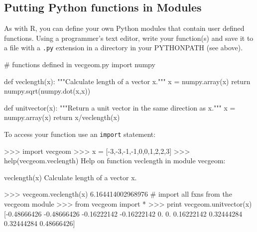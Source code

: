\subsection{Putting Python functions in Modules}

As with R, you can define your own Python modules that contain user
defined functions. Using a programmer's text editor, write your
function(s) and save it to a file with a \lstinline!.py! extension in a
directory in your PYTHONPATH (see above).

\begin{python}
# functions defined in vecgeom.py
import numpy

def veclength(x):
    """Calculate length of a vector x.""" 
    x = numpy.array(x)
    return numpy.sqrt(numpy.dot(x,x))


def unitvector(x):
    """Return a unit vector in the same direction as x."""
    x = numpy.array(x)
    return x/veclength(x)
\end{python}
%
To access your function use an \lstinline!import! statement:
%
\begin{python}
>>> import vecgeom
>>> x = [-3,-3,-1,-1,0,0,1,2,2,3]
>>> help(vecgeom.veclength)
Help on function veclength in module vecgeom:

veclength(x)
    Calculate length of a vector x.

>>> vecgeom.veclength(x)
6.164414002968976
# import all fxns from the vecgeom module
>>> from vecgeom import * 
>>> print vecgeom.unitvector(x)
[-0.48666426 -0.48666426 -0.16222142 -0.16222142  0.          0.   
     0.16222142  0.32444284  0.32444284  0.48666426]
\end{python}
